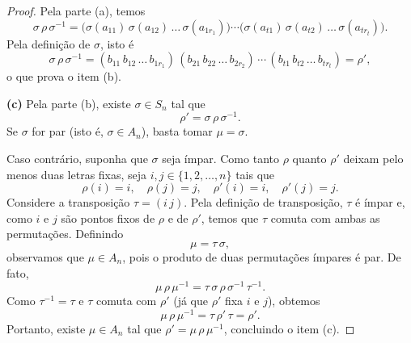 \documentclass[11pt,openany]{book}
\newenvironment{novo}{
    \color{red}
}{}
\begin{document}
\begin{novo}
\begin{proof}
    Pela parte (a), temos
    \[
    \sigma\,\rho\,\sigma^{-1} = \bigl(\sigma(a_{11})\,\sigma(a_{12})\,\dots\,\sigma(a_{1r_1})\bigr)
    \cdots
    \bigl(\sigma(a_{t1})\,\sigma(a_{t2})\,\dots\,\sigma(a_{tr_t})\bigr).
    \]
    Pela definição de $\sigma$, isto é
    \[
    \sigma\,\rho\,\sigma^{-1} = (b_{11}\,b_{12}\,\dots\,b_{1r_1})\,(b_{21}\,b_{22}\,\dots\,b_{2r_2})\,\cdots\,(b_{t1}\,b_{t2}\,\dots\,b_{tr_t}) = \rho',
    \]
    o que prova o item (b).

    \bigskip

    \textbf{(c)} Pela parte (b), existe $\sigma\in S_n$ tal que
    \[
    \rho'=\sigma\,\rho\,\sigma^{-1}.
    \]
    Se $\sigma$ for par (isto é, $\sigma\in A_n$), basta tomar $\mu=\sigma$.

    Caso contrário, suponha que $\sigma$ seja ímpar. Como tanto $\rho$ quanto $\rho'$ deixam pelo menos duas letras fixas, seja $i,j\in\{1,2,\dots,n\}$ tais que
    \[
    \rho(i)=i,\quad \rho(j)=j,\quad \rho'(i)=i,\quad \rho'(j)=j.
    \]
    Considere a transposição $\tau=(i\,j)$. Pela definição de transposição, $\tau$ é ímpar e, como $i$ e $j$ são pontos fixos de $\rho$ e de $\rho'$, temos que $\tau$ comuta com ambas as permutações. Definindo
    \[
    \mu=\tau\,\sigma,
    \]
    observamos que $\mu\in A_n$, pois o produto de duas permutações ímpares é par. De fato, 
    \[
    \mu\,\rho\,\mu^{-1} = \tau\,\sigma\,\rho\,\sigma^{-1}\,\tau^{-1}.
    \]
    Como $\tau^{-1}=\tau$ e $\tau$ comuta com $\rho'$ (já que $\rho'$ fixa $i$ e $j$), obtemos
    \[
    \mu\,\rho\,\mu^{-1} = \tau\,\rho'\,\tau = \rho'.
    \]
    Portanto, existe $\mu\in A_n$ tal que $\rho'=\mu\,\rho\,\mu^{-1}$, concluindo o item (c).
\end{proof}
\end{novo}
\end{document}
